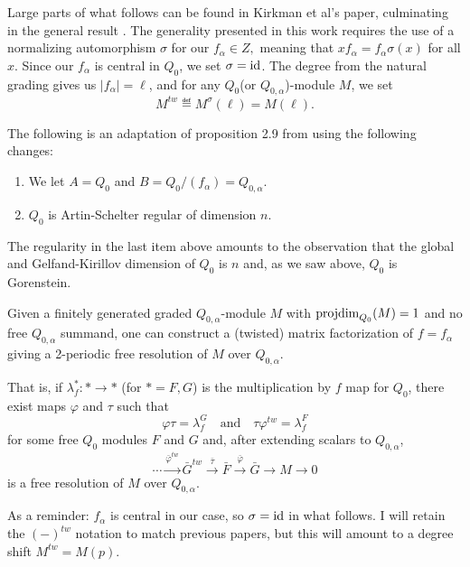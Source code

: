 \documentclass [11pt, proquest] {uwthesis}[2020/02/24]
\begin{document}
    Large parts of what follows can be found in Kirkman et al's paper, culminating in the general result \cite{kirkman13}. The generality presented in this work requires the use of a normalizing automorphism $\sigma$ for our $f_\alpha\in Z,$ meaning that $xf_\alpha=f_\alpha\sigma(x)$ for all $x$. Since our $f_\alpha$ is central in $Q_0$, we  set $\sigma=\operatorname{id}$. The degree from the natural grading gives us $|f_\alpha|=\ell$, and for any $Q_0$(or $Q_{0,\alpha}$)-module $M$, we set
    \[M^{tw}\eqdef M^\sigma(\ell)=M(\ell).\]
    
    The following is an adaptation of proposition 2.9 from \cite{kirkman13} using the following changes:
    \begin{enumerate}
        \item We let $A=Q_0$ and $B=Q_0/(f_\alpha)=Q_{0,\alpha}.$
        \item $Q_0$ is Artin-Schelter regular of dimension $n$.
    \end{enumerate}
    The regularity in the last item above amounts to the observation that the global and Gelfand-Kirillov dimension of $Q_0$ is $n$ and, as we saw above, $Q_0$ is Gorenstein.
    \begin{prop}
        Given a finitely generated graded $Q_{0,\alpha}$-module $M$ with $\operatorname{projdim}_{Q_0}(M)=1$ and no free $Q_{0,\alpha}$ summand, one can construct a (twisted) matrix factorization of $f=f_\alpha$ giving a 2-periodic free resolution of $M$ over $Q_{0,\alpha}$. 
        
        That is, if $\lambda_f^*:\ast\to \ast$ (for $\ast=F,G$) is the multiplication by $f$ map for $Q_0$, there exist maps $\varphi$ and $\tau$ such that
        \[\varphi\tau = \lambda_f^G\quad\text{and}\quad \tau\varphi^{tw}=\lambda_f^F\]
        for some free $Q_0$ modules $F$ and $G$ and, after extending scalars to $Q_{0,\alpha}$,
        \[\cdots\xrightarrow{\bar\varphi^{tw}}\bar G^{tw}\xrightarrow{\bar\tau} \bar F\xrightarrow{\bar\varphi} \bar G\to M\to 0\]
        is a free resolution of $M$ over $Q_{0,\alpha}.$
    \end{prop}
    
    \begin{rmk}
    As a reminder: $f_\alpha$ is central in our case, so $\sigma=\operatorname{id}$ in what follows. I will retain the $(-)^{tw}$ notation to match previous papers, but this will amount to a degree shift $M^{tw}=M(p).$
    \end{rmk}
    
\end{document}
